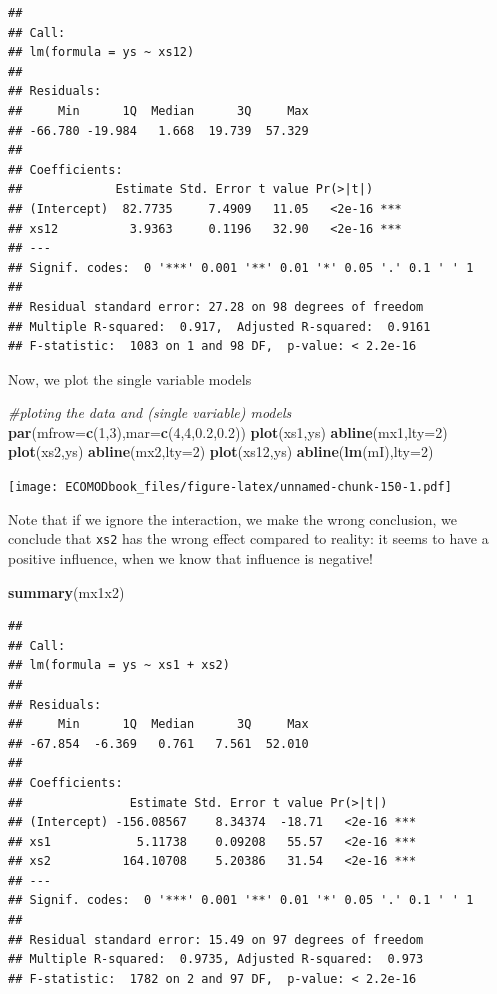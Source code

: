 \documentclass[
]{book}
\newenvironment{Shaded}{\begin{snugshade}}{\end{snugshade}}
\newcommand{\CommentTok}[1]{\textcolor[rgb]{0.56,0.35,0.01}{\textit{#1}}}
\newcommand{\DataTypeTok}[1]{\textcolor[rgb]{0.13,0.29,0.53}{#1}}
\newcommand{\DecValTok}[1]{\textcolor[rgb]{0.00,0.00,0.81}{#1}}
\newcommand{\FloatTok}[1]{\textcolor[rgb]{0.00,0.00,0.81}{#1}}
\newcommand{\KeywordTok}[1]{\textcolor[rgb]{0.13,0.29,0.53}{\textbf{#1}}}
\newcommand{\NormalTok}[1]{#1}
\begin{document}
\begin{verbatim}
## 
## Call:
## lm(formula = ys ~ xs12)
## 
## Residuals:
##     Min      1Q  Median      3Q     Max 
## -66.780 -19.984   1.668  19.739  57.329 
## 
## Coefficients:
##             Estimate Std. Error t value Pr(>|t|)    
## (Intercept)  82.7735     7.4909   11.05   <2e-16 ***
## xs12          3.9363     0.1196   32.90   <2e-16 ***
## ---
## Signif. codes:  0 '***' 0.001 '**' 0.01 '*' 0.05 '.' 0.1 ' ' 1
## 
## Residual standard error: 27.28 on 98 degrees of freedom
## Multiple R-squared:  0.917,	Adjusted R-squared:  0.9161 
## F-statistic:  1083 on 1 and 98 DF,  p-value: < 2.2e-16
\end{verbatim}

Now, we plot the single variable models

\begin{Shaded}
\begin{Highlighting}[]
\CommentTok{#ploting the data and (single variable) models}
\KeywordTok{par}\NormalTok{(}\DataTypeTok{mfrow=}\KeywordTok{c}\NormalTok{(}\DecValTok{1}\NormalTok{,}\DecValTok{3}\NormalTok{),}\DataTypeTok{mar=}\KeywordTok{c}\NormalTok{(}\DecValTok{4}\NormalTok{,}\DecValTok{4}\NormalTok{,}\FloatTok{0.2}\NormalTok{,}\FloatTok{0.2}\NormalTok{))}
\KeywordTok{plot}\NormalTok{(xs1,ys)}
\KeywordTok{abline}\NormalTok{(mx1,}\DataTypeTok{lty=}\DecValTok{2}\NormalTok{)}
\KeywordTok{plot}\NormalTok{(xs2,ys)}
\KeywordTok{abline}\NormalTok{(mx2,}\DataTypeTok{lty=}\DecValTok{2}\NormalTok{)}
\KeywordTok{plot}\NormalTok{(xs12,ys)}
\KeywordTok{abline}\NormalTok{(}\KeywordTok{lm}\NormalTok{(mI),}\DataTypeTok{lty=}\DecValTok{2}\NormalTok{)}
\end{Highlighting}
\end{Shaded}

\texttt{[image: ECOMODbook\_files/figure-latex/unnamed-chunk-150-1.pdf]}

Note that if we ignore the interaction, we make the wrong conclusion, we conclude that \texttt{xs2} has the wrong effect compared to reality: it seems to have a positive influence, when we know that influence is negative!

\begin{Shaded}
\begin{Highlighting}[]
\KeywordTok{summary}\NormalTok{(mx1x2)}
\end{Highlighting}
\end{Shaded}

\begin{verbatim}
## 
## Call:
## lm(formula = ys ~ xs1 + xs2)
## 
## Residuals:
##     Min      1Q  Median      3Q     Max 
## -67.854  -6.369   0.761   7.561  52.010 
## 
## Coefficients:
##               Estimate Std. Error t value Pr(>|t|)    
## (Intercept) -156.08567    8.34374  -18.71   <2e-16 ***
## xs1            5.11738    0.09208   55.57   <2e-16 ***
## xs2          164.10708    5.20386   31.54   <2e-16 ***
## ---
## Signif. codes:  0 '***' 0.001 '**' 0.01 '*' 0.05 '.' 0.1 ' ' 1
## 
## Residual standard error: 15.49 on 97 degrees of freedom
## Multiple R-squared:  0.9735,	Adjusted R-squared:  0.973 
## F-statistic:  1782 on 2 and 97 DF,  p-value: < 2.2e-16
\end{verbatim}
\end{document}
